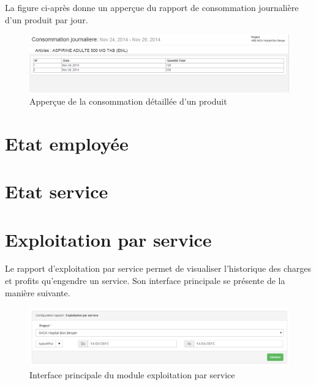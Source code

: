 \documentclass[12pt,a4paper]{report}
\begin{document}
La figure ci-après donne un apperçue du rapport de consommation journalière d'un produit par jour.

\begin{figure}[h]
\begin{center}
\includegraphics[width=14cm]{pic/ConsoDetJourn.png}
\end{center}
\caption{Apperçue de la consommation détaillée d'un produit}
\label{Apperçue de la consommation détaillée d'un produit}
\end{figure}

\newpage
\section{Etat employée}

\newpage
\section{Etat service}



\newpage
\section{Exploitation par service}
Le rapport d'exploitation par service permet de visualiser l'historique des charges et profits qu'engendre un service. Son interface principale se présente de la manière suivante. 

\begin{figure}[h]
\begin{center}
\includegraphics[width=14cm]{pic/ExploService.png}
\end{center}
\caption{Interface principale du module exploitation par service}
\label{Interface principale du module exploitation par service}
\end{figure}
\end{document}
